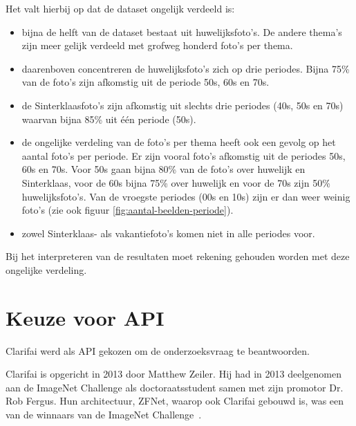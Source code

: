 Het valt hierbij op dat de dataset ongelijk verdeeld is:
\begin{itemize}

	\item bijna de helft van de dataset bestaat uit huwelijksfoto’s. De andere thema’s zijn meer gelijk verdeeld met grofweg honderd foto’s per thema. 
	\item daarenboven concentreren de huwelijksfoto’s zich op drie periodes. Bijna 75\% van de foto’s zijn afkomstig uit de periode 50s, 60s en 70s. 
	\item de Sinterklaasfoto’s zijn afkomstig uit slechts drie periodes (40s, 50s en 70s) waarvan bijna 85\% uit één periode (50s).
	\item de ongelijke verdeling van de foto’s per thema heeft ook een gevolg op het aantal foto’s per periode. Er zijn vooral foto’s afkomstig uit de periodes 50s, 60s en 70s. Voor 50s gaan bijna 80\% van de foto’s over huwelijk en Sinterklaas, voor de 60s bijna 75\% over huwelijk en voor de 70s zijn 50\% huwelijksfoto’s. Van de vroegste periodes (00s en 10s) zijn er dan weer weinig foto’s (zie ook figuur \ref{fig:aantal-beelden-periode}).
	\item zowel Sinterklaas- als vakantiefoto’s komen niet in alle periodes voor.
\end{itemize}

Bij het interpreteren van de resultaten moet rekening gehouden worden met deze ongelijke verdeling.

\section{Keuze voor API}
\label{sec:keuze-voor-api}

Clarifai werd als API gekozen om de onderzoeksvraag te beantwoorden. 

Clarifai is opgericht in 2013 door Matthew Zeiler. Hij had in 2013 deelgenomen aan de ImageNet Challenge als doctoraatsstudent samen met zijn promotor Dr. Rob Fergus. Hun architectuur, ZFNet, waarop ook Clarifai gebouwd is, was een van de winnaars van de ImageNet Challenge~\autocite{Tsang2018}.

